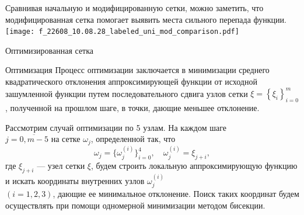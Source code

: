 \documentclass[ignoreonframetext,unicode]{beamer}
\begin{document}
\begin{frame}{}%
	Сравнивая начальную и модифицированную сетки, можно заметить, что модифицированная сетка помогает выявить места сильного перепада функции.
	\center
	\texttt{[image: f\_22608\_10.08.28\_labeled\_uni\_mod\_comparison.pdf]}%
	
\end{frame}

\begin{frame}{Оптимизированная сетка}
	\small
	\begin{block}{Оптимизация}
		Процесс оптимизации заключается в минимизации среднего квадратического отклонения аппроксимирующей функции от исходной зашумленной функции путем последовательного сдвига узлов  сетки  $\xi = \left\{ \xi_i \right\}_{i = 0}^{m}$, полученной на прошлом шаге, в точки, дающие меньшее отклонение. 
	\end{block}
		Рассмотрим случай оптимизации по 5 узлам. 
		На каждом шаге \\$ j= \overline{0, m\!-\!5}$ на сетке $\omega_j$, определенной так, что
		$$
		\omega_j = \{ \omega_j^{(i)} \}_{i = 0}^4,
		\quad
		\omega_j^{(i)} = \xi_{j + i}, 
		$$ 
		где $\xi_{j + i}$ --- узел сетки $\xi$, будем строить локальную аппроксимирующую функцию и искать координаты
		внутренних узлов $ \omega_j^{(i)}$ \\ $( i = 1, 2, 3)$, дающие ее минимальное отклонение. 
		Поиск таких координат будем осуществлять при помощи одномерной минимизации методом бисекции. 
		\normalsize
		
\end{frame}
\end{document}

